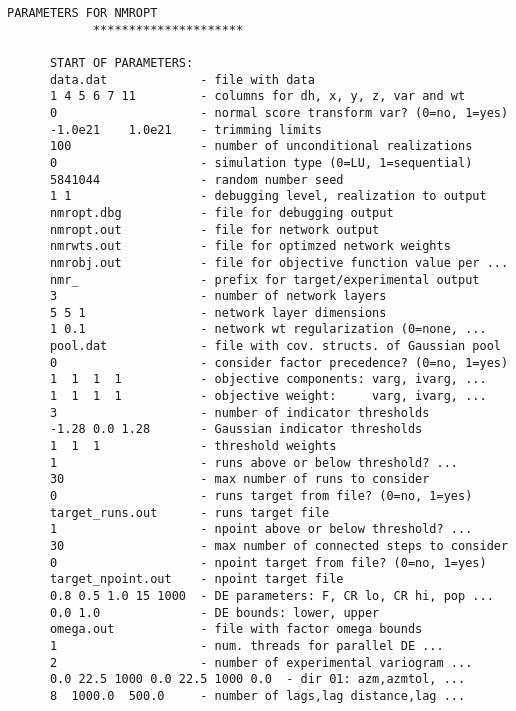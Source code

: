 \begin{framed}
   \begin{lstlisting}[style=ccgParameterfile]
            PARAMETERS FOR NMROPT
            *********************

      START OF PARAMETERS:
      data.dat             - file with data
      1 4 5 6 7 11         - columns for dh, x, y, z, var and wt
      0                    - normal score transform var? (0=no, 1=yes)
      -1.0e21    1.0e21    - trimming limits
      100                  - number of unconditional realizations
      0                    - simulation type (0=LU, 1=sequential)
      5841044              - random number seed
      1 1                  - debugging level, realization to output
      nmropt.dbg           - file for debugging output
      nmropt.out           - file for network output
      nmrwts.out           - file for optimzed network weights
      nmrobj.out           - file for objective function value per ...
      nmr_                 - prefix for target/experimental output
      3                    - number of network layers 
      5 5 1                - network layer dimensions 
      1 0.1                - network wt regularization (0=none, ...
      pool.dat             - file with cov. structs. of Gaussian pool
      0                    - consider factor precedence? (0=no, 1=yes)
      1  1  1  1           - objective components: varg, ivarg, ...
      1  1  1  1           - objective weight:     varg, ivarg, ...
      3                    - number of indicator thresholds
      -1.28 0.0 1.28       - Gaussian indicator thresholds
      1  1  1              - threshold weights 
      1                    - runs above or below threshold? ...
      30                   - max number of runs to consider
      0                    - runs target from file? (0=no, 1=yes)
      target_runs.out      - runs target file
      1                    - npoint above or below threshold? ...
      30                   - max number of connected steps to consider
      0                    - npoint target from file? (0=no, 1=yes)
      target_npoint.out    - npoint target file
      0.8 0.5 1.0 15 1000  - DE parameters: F, CR lo, CR hi, pop ...
      0.0 1.0              - DE bounds: lower, upper
      omega.out            - file with factor omega bounds
      1                    - num. threads for parallel DE ...
      2                    - number of experimental variogram ...
      0.0 22.5 1000 0.0 22.5 1000 0.0  - dir 01: azm,azmtol, ...
      8  1000.0  500.0     - number of lags,lag distance,lag ...

\end{lstlisting}
\end{framed}
